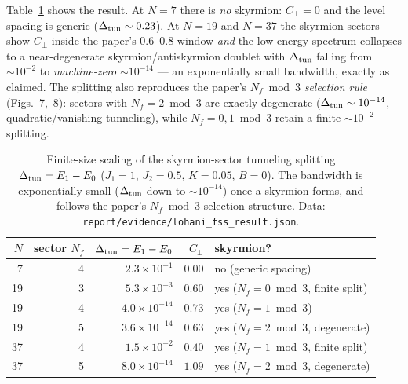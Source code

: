 \documentclass[11pt]{article}
\newcommand{\Cperp}{C_{\perp}}
\begin{document}
Table~\ref{tab:fss} shows the result. At $N=7$ there is \emph{no} skyrmion: $\Cperp=0$ and the
level spacing is generic ($\Delta_{\rm tun}\sim0.23$). At $N=19$ and $N=37$ the skyrmion sectors
show $\Cperp$ inside the paper's $0.6$--$0.8$ window \emph{and} the low-energy spectrum collapses to
a near-degenerate skyrmion/antiskyrmion doublet with $\Delta_{\rm tun}$ falling from $\sim10^{-2}$
to \emph{machine-zero} $\sim10^{-14}$ --- an exponentially small bandwidth, exactly as claimed.
The splitting also reproduces the paper's $N_f\bmod3$ \emph{selection rule} (Figs.~7,~8): sectors
with $N_f=2\bmod3$ are exactly degenerate ($\Delta_{\rm tun}\sim10^{-14}$, quadratic/vanishing
tunneling), while $N_f=0,1\bmod3$ retain a finite $\sim10^{-2}$ splitting.

\begin{table}[h]
\centering
\begin{tabular}{rrrrl}
\toprule
$N$ & sector $N_f$ & $\Delta_{\rm tun}=E_1-E_0$ & $\Cperp$ & skyrmion? \\
\midrule
7  & 4 & $2.3\times10^{-1}$ & $0.00$ & no (generic spacing) \\
19 & 3 & $5.3\times10^{-3}$ & $0.60$ & yes ($N_f{=}0\bmod3$, finite split) \\
19 & 4 & $4.0\times10^{-14}$ & $\mathbf{0.73}$ & yes ($N_f{=}1\bmod3$) \\
19 & 5 & $3.6\times10^{-14}$ & $0.63$ & yes ($N_f{=}2\bmod3$, degenerate) \\
37 & 4 & $1.5\times10^{-2}$ & $0.40$ & yes ($N_f{=}1\bmod3$, finite split) \\
37 & 5 & $8.0\times10^{-14}$ & $1.09$ & yes ($N_f{=}2\bmod3$, degenerate) \\
\bottomrule
\end{tabular}
\caption{Finite-size scaling of the skyrmion-sector tunneling splitting
$\Delta_{\rm tun}=E_1-E_0$ ($J_1{=}1$, $J_2{=}0.5$, $K{=}0.05$, $B{=}0$). The bandwidth is
exponentially small ($\Delta_{\rm tun}$ down to $\sim10^{-14}$) once a skyrmion forms, and follows
the paper's $N_f\bmod3$ selection structure. Data: \texttt{report/evidence/lohani\_fss\_result.json}.}
\label{tab:fss}
\end{table}
\end{document}
